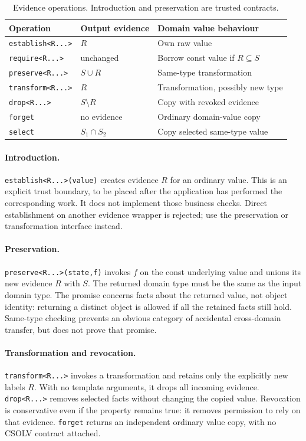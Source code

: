 \documentclass[11pt]{article}
\begin{document}
\begin{table}[ht]
\centering\small
\begin{tabular}{lll}
\toprule
Operation & Output evidence & Domain value behaviour\\
\midrule
\texttt{establish<R...>} & $R$ & Own raw value\\
\texttt{require<R...>} & unchanged & Borrow const value if $R\subseteq S$\\
\texttt{preserve<R...>} & $S\cup R$ & Same-type transformation\\
\texttt{transform<R...>} & $R$ & Transformation, possibly new type\\
\texttt{drop<R...>} & $S\setminus R$ & Copy with revoked evidence\\
\texttt{forget} & no evidence & Ordinary domain-value copy\\
\texttt{select} & $S_1\cap S_2$ & Copy selected same-type value\\
\bottomrule
\end{tabular}
\caption{Evidence operations. Introduction and preservation are trusted contracts.}
\label{tab:algebra}
\end{table}

\paragraph{Introduction.}
\texttt{establish<R...>(value)} creates evidence $R$ for an ordinary value.
This is an explicit trust boundary, to be placed after the application has
performed the corresponding work. It does not implement those business checks.
Direct establishment on another evidence wrapper is rejected; use the
preservation or transformation interface instead.

\paragraph{Preservation.}
\texttt{preserve<R...>(state,f)} invokes $f$ on the const underlying value and
unions its new evidence $R$ with $S$. The returned domain type must be the same
as the input domain type. The promise concerns facts about the returned value,
not object identity: returning a distinct object is allowed if all the retained
facts still hold. Same-type checking prevents an obvious category of accidental
cross-domain transfer, but does not prove that promise.

\paragraph{Transformation and revocation.}
\texttt{transform<R...>} invokes a transformation and retains only the explicitly
new labels $R$. With no template arguments, it drops all incoming evidence.
\texttt{drop<R...>} removes selected facts without changing the copied value.
Revocation is conservative even if the property remains true: it removes
permission to rely on that evidence. \texttt{forget} returns an independent
ordinary value copy, with no CSOLV contract attached.
\end{document}
